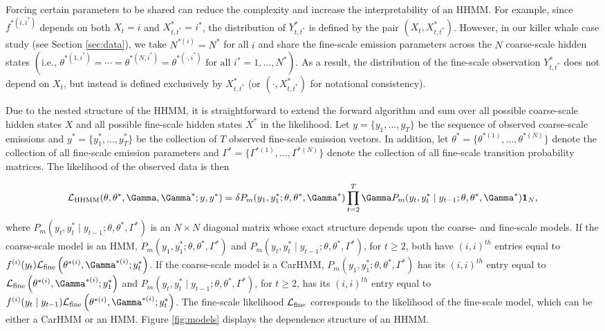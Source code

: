 Forcing certain parameters to be shared can reduce the complexity and increase the interpretability of an HHMM. For example, since $f^{*(i,i^*)}$ depends on both $X_t = i$ and $X^*_{t,t^*} = i^*$, the distribution of $Y^*_{t,t^*}$ is defined by the pair $(X_t,X^*_{t,t^*})$. However, in our killer whale case study (see Section \ref{sec:data}), we take $N^{*(i)} = N^*$ for all $i$ and share the fine-scale emission parameters across the $N$ coarse-scale hidden states $\left( \text{i.e., } \theta^{*(1,i^*)} = \cdots = \theta^{*(N,i^*)} = \theta^{*(\cdot,i^*)} \text{ for all } i^* = 1, \ldots, N^* \right)$. As a result, the distribution of the fine-scale observation $Y^*_{t,t^*}$ does not depend on $X_t$, but instead is defined exclusively by $X^*_{t,t^*}$ (or $(\cdot,X^*_{t,t^*})$ for notational consistency).

Due to the nested structure of the HHMM, it is straightforward to extend the forward algorithm and sum over all possible coarse-scale hidden states $X$ and all possible fine-scale hidden states $X^*$ in the likelihood.
%
Let $y = \{y_1, \ldots,y_T\}$ be the sequence of observed coarse-scale emissions and
$y^* = \{y^*_1, \ldots,y^*_T\}$ be the collection of $T$ observed fine-scale emission vectors.
%
In addition, let $\theta^* = \{\theta^{*(1)}, \ldots, \theta^{*(N)}\}$ denote the collection of all fine-scale emission parameters and $\Gamma^* = \{\Gamma^{*(1)}, \ldots, \Gamma^{*(N)}\}$ denote the collection of all fine-scale transition probability matrices. The likelihood of the observed data is then

\begin{equation}
    \calL_{\text{HHMM}}(\theta,\theta^*,\Gamma,\Gamma^*;y,y^*) = \delta P_m(y_1,y_1^*;\theta,\theta^*,\Gamma^*) \prod_{t=2}^T \Gamma P_m(y_t,y_t^* \mid y_{t-1};\theta,\theta^*,\Gamma^*) \mathbf{1}_N,
    \label{eqn:HHMM_likelihood}
\end{equation}
%
where $P_m(y_t,y_t^* \mid y_{t-1};\theta,\theta^*,\Gamma^*)$ is an $N \times N$ diagonal matrix whose exact structure depends upon the coarse- and fine-scale models. If the coarse-scale model is an HMM, $P_m(y_1,y_1^*;\theta,\theta^*,\Gamma^*)$ and $P_m(y_t,y_t^* \mid y_{t-1};\theta,\theta^*,\Gamma^*)$, for $t \geq 2$, both have $(i,i)^{th}$ entries equal to 
$f^{(i)}(y_t)\calL_{\text{fine}}\left(\theta^{*(i)},
\Gamma^{*(i)};y_t^*\right)$. 
If the coarse-scale model is a CarHMM, $P_m(y_1,y_1^*;\theta,\theta^*,\Gamma^*)$ has its $(i,i)^{th}$ entry equal to $\calL_{\text{fine}}\left(\theta^{*(i)},
\Gamma^{*(i)};y_1^*\right)$ and $P_m(y_t,y_t^* \mid y_{t-1};\theta,\theta^*,\Gamma^*)$, for $t \geq 2$, has its $(i,i)^{th}$ entry equal to $f^{(i)}(y_t \mid y_{t-1})\calL_{\text{fine}}\left(\theta^{*(i)},
\Gamma^{*(i)};y_t^*\right)$.
The fine-scale likelihood $\mathcal{L}_{\text{fine}}$ corresponds to the likelihood of the fine-scale model, which can be either a CarHMM or an HMM. Figure \ref{fig:models} displays the dependence structure of an HHMM.

